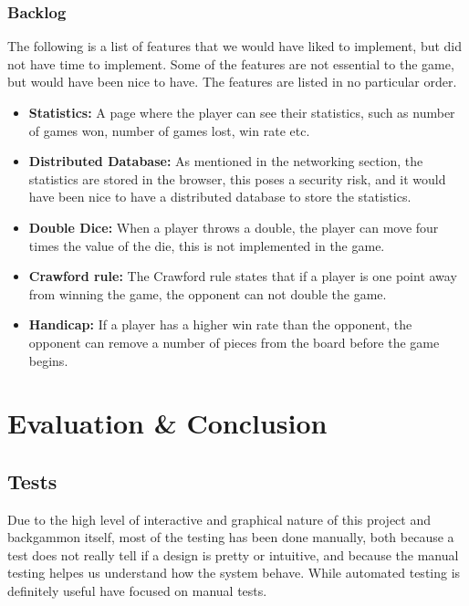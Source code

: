 \documentclass[ twoside,openright,titlepage,numbers=noenddot,headinclude,%
                footinclude=true,cleardoublepage=empty,abstractoff, %
                BCOR=5mm,paper=a4,fontsize=11pt,%
                ngerman,american,%
                ]{scrreprt}
\begin{document}
\subsection{Backlog}
The following is a list of features that we would have liked to implement, but did not have time to implement. Some of the features are not essential to the game, but would have been nice to have. The features are listed in no particular order.
\begin{itemize}
  \item \textbf{Statistics:} A page where the player can see their statistics, such as number of games won, number of games lost, win rate etc.
  \item \textbf{Distributed Database:} As mentioned in the networking section, the statistics are stored in the browser, this poses a security risk, and it would have been nice to have a distributed database to store the statistics.
  \item \textbf{Double Dice:} When a player throws a double, the player can move four times the value of the die, this is not implemented in the game.
  \item \textbf{Crawford rule:} The Crawford rule states that if a player is one point away from winning the game, the opponent can not double the game. 
  \item \textbf{Handicap:} If a player has a higher win rate than the opponent, the opponent can remove a number of pieces from the board before the game begins.
\end{itemize}




\chapter{Evaluation \& Conclusion}
\label{cha:evaluation}

\section{Tests}
Due to the high level of interactive and graphical nature of this project and backgammon itself, most of the testing has been done manually, both because a test does not really tell if a design is pretty or intuitive, and because the manual testing helpes us understand how the system behave. While automated testing is definitely useful have focused on manual tests. 
\end{document}
